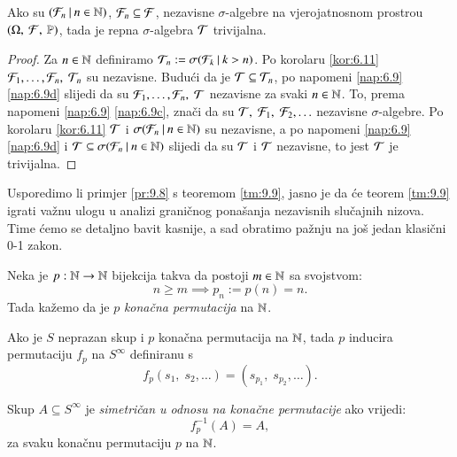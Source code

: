 \begin{tm}  \label{tm:9.9}
    Ako su $({\mathcal{F}_n} \: | \: {n \in \mathbb{N}})$, $\mathcal{F}_n \subseteq \mathcal{F}$, nezavisne $\sigma$-algebre na vjerojatnosnom prostrou $(\Omega, \: \mathcal{F}, \: \mathbb{P})$, tada je repna $\sigma$-algebra $\mathcal{T}$ trivijalna.
\end{tm}

\begin{proof}
    Za $n \in \mathbb{N}$ definiramo $\mathcal{T}_n := \sigma({\mathcal{F}_k} \: | \: {k > n})$.
    Po korolaru \ref{kor:6.11} $\mathcal{F}_1, \ldots, \mathcal{F}_n, \; \mathcal{T}_n$ su nezavisne.
    Budu\' ci da je $\mathcal{T} \subseteq \mathcal{T}_n$, po napomeni \ref{nap:6.9} \ref{nap:6.9d} slijedi da su $\mathcal{F}_1, \ldots, \mathcal{F}_n, \; \mathcal{T}$ nezavisne za svaki $n \in \mathbb{N}$.
    To, prema napomeni \ref{nap:6.9} \ref{nap:6.9c}, zna\v ci da su $\mathcal{T}, \; \mathcal{F}_1, \; \mathcal{F}_2, \ldots$ nezavisne $\sigma$-algebre.
    Po korolaru \ref{kor:6.11} $\mathcal{T}$ i $\sigma({\mathcal{F}_n} \: | \: {n \in \mathbb{N}})$ su nezavisne, a po napomeni \ref{nap:6.9} \ref{nap:6.9d} i $\mathcal{T} \subseteq \sigma({\mathcal{F}_n} \: | \: {n \in \mathbb{N}})$ slijedi da su $\mathcal{T}$ i $\mathcal{T}$ nezavisne, to jest $\mathcal{T}$ je trivijalna.
\end{proof}

Usporedimo li primjer \ref{pr:9.8} s teoremom \ref{tm:9.9}, jasno je da \' ce teorem \ref{tm:9.9} igrati va\v znu ulogu u analizi grani\v cnog pona\v sanja nezavisnih slu\v cajnih nizova.
Time \' cemo se detaljno bavit kasnije, a sad obratimo pa\v znju na jo\v s jedan klasi\v cni 0-1 zakon.

\begin{defn}    \label{defn:9.9-1}
    Neka je $p: \mathbb{N} \to \mathbb{N}$ bijekcija takva da postoji $m \in \mathbb{N}$ sa svojstvom:
    \begin{equation*}
        n \geq m \implies p_n := p(n) = n.
    \end{equation*}
    Tada ka\v zemo da je $p$ \emph{kona\v cna permutacija} na $\mathbb{N}$.
\end{defn}

Ako je $S$ neprazan skup i $p$ kona\v cna permutacija na $\mathbb{N}$, tada $p$ inducira permutaciju $f_p$ na $S^\infty$ definiranu s
\begin{equation*}
    f_p (s_1, \; s_2, \ldots) = (s_{p_1}, \; s_{p_2}, \ldots).
\end{equation*}

\begin{defn}    \label{defn:9.9-2}
    Skup $A \subseteq S^\infty$ je \emph{simetri\v can u odnosu na kona\v cne permutacije} ako vrijedi:
    \begin{equation*}
        f_p^{-1} (A) = A,
    \end{equation*}
    za svaku kona\v cnu permutaciju $p$ na $\mathbb{N}$.
\end{defn}

